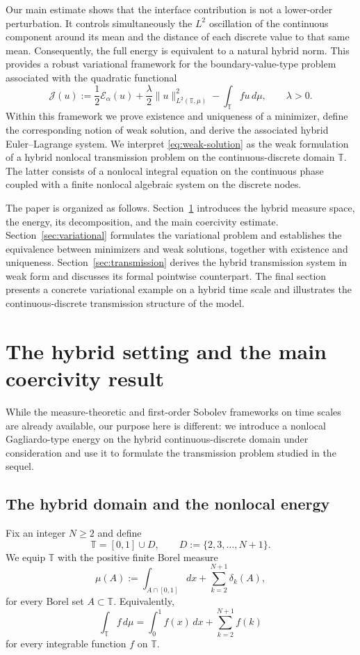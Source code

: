 \documentclass[11pt]{article}
\numberwithin{equation}{section}
\theoremstyle{definition}
\newcommand{\T}{\mathbb{T}}
\newcommand{\EE}{\mathcal{E}}
\newcommand{\JJ}{\mathcal{J}}
\newcommand{\ddmu}{\,d\mu}
\newcommand{\norm}[1]{\lVert#1\rVert}
\begin{document}
Our main estimate shows that the interface contribution is not a lower-order perturbation. It controls simultaneously the $L^2$ oscillation of the continuous component around its mean and the distance of each discrete value to that same mean. Consequently, the full energy is equivalent to a natural hybrid norm. This provides a robust variational framework for the boundary-value-type problem associated with the quadratic functional
\[
\JJ(u):=\frac12\EE_\alpha(u)+\frac{\lambda}{2}\norm{u}_{L^2(\T,\mu)}^2-\int_{\T}fu\ddmu,
\qquad \lambda>0.
\]
Within this framework we prove existence and uniqueness of a minimizer, define the corresponding notion of weak solution, and derive the associated hybrid Euler--Lagrange system. We interpret \eqref{eq:weak-solution} as the weak formulation of a hybrid nonlocal transmission problem on the continuous-discrete domain $\T$. The latter consists of a nonlocal integral equation on the continuous phase coupled with a finite nonlocal algebraic system on the discrete nodes.

The paper is organized as follows. Section~\ref{sec:coercive-framework} introduces the hybrid measure space, the energy, its decomposition, and the main coercivity estimate. Section~\ref{sec:variational} formulates the variational problem and establishes the equivalence between minimizers and weak solutions, together with existence and uniqueness. Section~\ref{sec:transmission} derives the hybrid transmission system in weak form and discusses its formal pointwise counterpart. The final section presents a concrete variational example on a hybrid time scale and illustrates the continuous-discrete transmission structure of the model.

\section{The hybrid setting and the main coercivity result}\label{sec:coercive-framework}
While the measure-theoretic and first-order Sobolev frameworks on time scales are already available, our purpose here is different: we introduce a nonlocal Gagliardo-type energy on the hybrid continuous-discrete domain under consideration and use it to formulate the transmission problem studied in the sequel.
\subsection{The hybrid domain and the nonlocal energy}

Fix an integer $N\ge 2$ and define
\[
\T=[0,1]\cup D,
\qquad D:=\{2,3,\dots,N+1\}.
\]
We equip $\T$ with the positive finite Borel measure
\begin{equation}\label{eq:def-mu}
\mu(A):=\int_{A\cap[0,1]}dx+\sum_{k=2}^{N+1}\delta_k(A),
\end{equation}
for every Borel set $A\subset \T$. Equivalently,
\[
\int_{\T} f\ddmu =\int_0^1 f(x)\,dx+\sum_{k=2}^{N+1} f(k)
\]
for every integrable function $f$ on $\T$.
\end{document}
